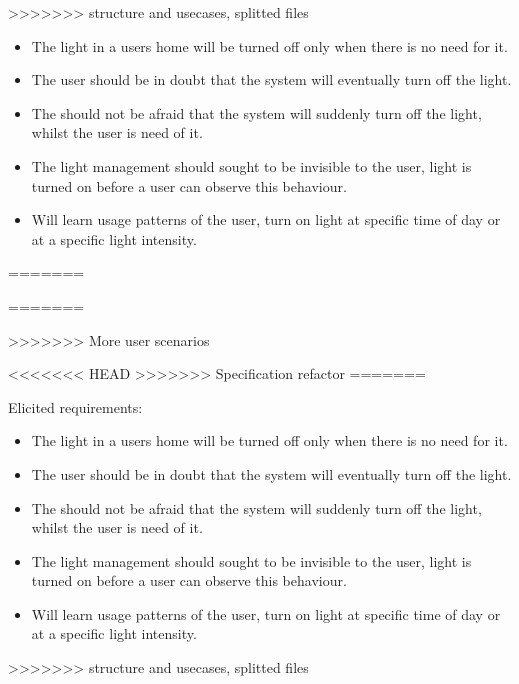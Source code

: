 
>>>>>>> structure and usecases, splitted files

\begin{itemize}
\item The light in a users home will be turned off only when there is no need for it.
\item The user should be in doubt that the system will eventually turn off the light.
\item The should not be afraid that the system will suddenly turn off the light, whilst the user is need of it.
\item The light management should sought to be invisible to the user, light is turned on before a user can observe this behaviour.
\item Will learn usage patterns of the user, turn on light at specific time of day or at a specific light intensity.
\end{itemize}
=======

=======

>>>>>>> More user scenarios



<<<<<<< HEAD
>>>>>>> Specification refactor
=======



Elicited requirements: %

\begin{itemize}
\item The light in a users home will be turned off only when there is no need for it.
\item The user should be in doubt that the system will eventually turn off the light.
\item The should not be afraid that the system will suddenly turn off the light, whilst the user is need of it.
\item The light management should sought to be invisible to the user, light is turned on before a user can observe this behaviour.
\item Will learn usage patterns of the user, turn on light at specific time of day or at a specific light intensity.
\end{itemize}
>>>>>>> structure and usecases, splitted files
